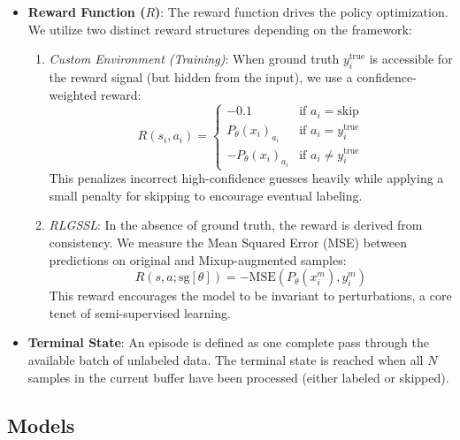 \documentclass[pdflatex,sn-mathphys-num]{sn-jnl}%
\theoremstyle{thmstyleone}%
\theoremstyle{thmstyletwo}%
\theoremstyle{thmstylethree}%
\begin{document}
\begin{itemize}
    \item \textbf{Reward Function ($R$)}: The reward function drives the policy optimization. We utilize two distinct reward structures depending on the framework:
    \begin{enumerate}
        \item \textit{Custom Environment (Training)}: When ground truth $y_i^{\text{true}}$ is accessible for the reward signal (but hidden from the input), we use a confidence-weighted reward:
        \begin{equation}
        R(s_i, a_i) = \begin{cases}
        -0.1 & \text{if } a_i = \text{skip} \\
        P_\theta(x_i)_{a_i} & \text{if } a_i = y_i^{\text{true}} \\
        -P_\theta(x_i)_{a_i} & \text{if } a_i \neq y_i^{\text{true}}
        \end{cases}
        \end{equation}
        This penalizes incorrect high-confidence guesses heavily while applying a small penalty for skipping to encourage eventual labeling.
        
        \item \textit{RLGSSL}: In the absence of ground truth, the reward is derived from consistency. We measure the Mean Squared Error (MSE) between predictions on original and Mixup-augmented samples:
        \begin{equation}
        R(s, a; \text{sg}[\theta]) = -\text{MSE}(P_\theta(x_i^m), y_i^m)
        \end{equation}
        This reward encourages the model to be invariant to perturbations, a core tenet of semi-supervised learning.
    \end{enumerate}
    
    \item \textbf{Terminal State}: An episode is defined as one complete pass through the available batch of unlabeled data. The terminal state is reached when all $N$ samples in the current buffer have been processed (either labeled or skipped).
\end{itemize}

\subsection{Models}\label{subsec:models}
\end{document}
